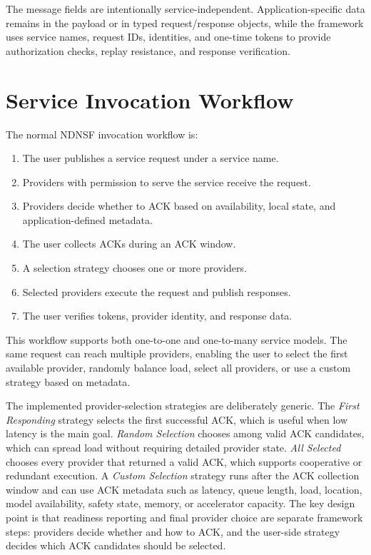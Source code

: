 The message fields are intentionally service-independent. Application-specific
data remains in the payload or in typed request/response objects, while the
framework uses service names, request IDs, identities, and one-time tokens to
provide authorization checks, replay resistance, and response verification.

\section{Service Invocation Workflow}

The normal NDNSF invocation workflow is:

\begin{enumerate}[leftmargin=*]
  \item The user publishes a service request under a service name.
  \item Providers with permission to serve the service receive the request.
  \item Providers decide whether to ACK based on availability, local state, and
  application-defined metadata.
  \item The user collects ACKs during an ACK window.
  \item A selection strategy chooses one or more providers.
  \item Selected providers execute the request and publish responses.
  \item The user verifies tokens, provider identity, and response data.
\end{enumerate}

This workflow supports both one-to-one and one-to-many service models. The same
request can reach multiple providers, enabling the user to select the first
available provider, randomly balance load, select all providers, or use a
custom strategy based on metadata.

The implemented provider-selection strategies are deliberately generic. The
\emph{First Responding} strategy selects the first successful ACK, which is
useful when low latency is the main goal. \emph{Random Selection} chooses among
valid ACK candidates, which can spread load without requiring detailed provider
state. \emph{All Selected} chooses every provider that returned a valid ACK,
which supports cooperative or redundant execution. A \emph{Custom Selection}
strategy runs after the ACK collection window and can use ACK metadata such as
latency, queue length, load, location, model availability, safety state, memory,
or accelerator capacity. The key design point is that readiness reporting and
final provider choice are separate framework steps: providers decide whether and
how to ACK, and the user-side strategy decides which ACK candidates should be
selected.

